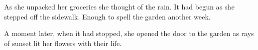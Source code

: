 

As she unpacked her groceries she thought of the rain.  It had begun
as she stepped off the sidewalk.  Enough to spell the garden another
week.  

A moment later, when it had stopped, she opened the door to the garden
as rays of sunset lit her flowers with their life.

\bye
